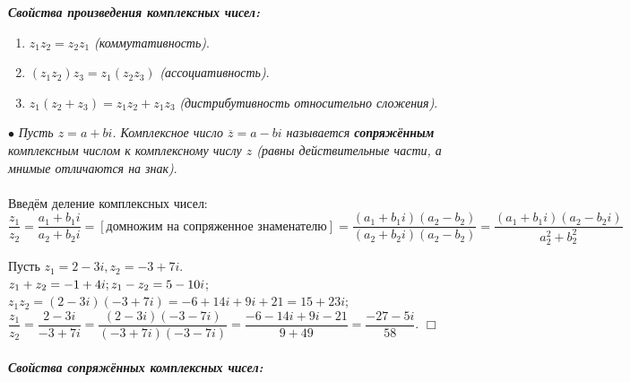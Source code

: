 \documentclass[a4paper, 12pt]{report}
\newenvironment{examp} %
{\par\noindent{\textbf{\textsc{Пример:}}}} %
{\hfill$\scriptstyle\Box$}
\begin{document}
\textbf{\textit{Свойства произведения комплексных чисел:}}
\begin{enumerate}
	\item $z_1z_2 = z_2z_1$ \textit{(коммутативность)}.
	
	\item $(z_1z_2)z_3 = z_1(z_2z_3)$ \textit{(ассоциативность)}.
	
	\item $z_1(z_2 + z_3) = z_1z_2 + z_1z_3$ \textit{(дистрибутивность относительно сложения)}.
\end{enumerate}
$\bullet$ \textit{Пусть $z = a + bi$. Комплексное число $\overline{z} = a - bi$ называется \textbf{сопряжённым} комплексным числом к комплексному числу $z$ (равны действительные части, а мнимые отличаются на знак)}.\\\\
Введём деление комплексных чисел: $\dfrac{z_1}{z_2} = \dfrac{a_1 + b_1i}{a_2 + b_2i} = [\text{домножим на сопряженное знаменателю}] = \dfrac{(a_1 + b_1i)(a_2 - b_2)}{(a_2 + b_2i)(a_2 - b_2)} = \dfrac{(a_1 + b_1i)(a_2 - b_2i)}{a_2^2 + b_2^2}$\\
\begin{examp} Пусть
	$z_1 = 2 - 3i, z_2 = -3 + 7i$.\\
	$z_1 + z_2 = -1 + 4i;\\ z_1 - z_2 = 5 - 10i$;\\
	$z_1z_2 = (2 - 3i)(-3 + 7i) = -6 + 14i + 9i + 21 = 15 + 23i$;\\
	$\dfrac{z_1}{z_2} = \dfrac{2 - 3i}{-3 + 7i} = \dfrac{(2 - 3i)(-3-7i)}{(-3 + 7i)(-3 - 7i)} = \dfrac{-6 - 14i + 9i - 21}{9 + 49} = \dfrac{-27 - 5i}{58}.$
\end{examp}\\\\
\textbf{\textit{Свойства сопряжённых комплексных чисел:}}
\end{document}
